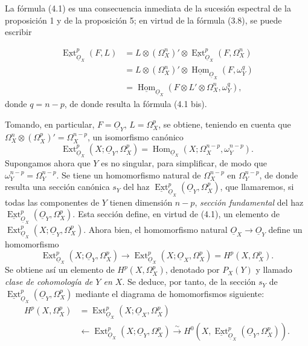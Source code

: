 \documentclass[11pt,twoside,openany]{book}
\numberwithin{equation}{section}
\newcommand{\src}[1]{%
  \phantomsection\hypertarget{src:#1}{}%
  \marginpar{\raggedleft\footnotesize\sffamily #1}%
}
\newcommand{\Osh}{\underline{O}}
\newcommand{\Homsh}{\underline{\operatorname{Hom}}}
\newcommand{\Extsh}{\underline{\operatorname{Ext}}}
\theoremstyle{plain}
\theoremstyle{definition}
\theoremstyle{remark}
\newcommand{\FgaUnitKey}{frontmatter}
\renewcommand{\src}[1]{%
  \phantomsection\hypertarget{src:\FgaUnitKey:#1}{}%
  \marginpar{\raggedleft\footnotesize\sffamily #1}%
}
\theoremstyle{plain}
\theoremstyle{definition}
\theoremstyle{remark}
\begin{document}
La fórmula (4.1) es una consecuencia inmediata de la sucesión espectral de la
proposición 1 y de la proposición 5; en virtud de la fórmula (3.8), se puede
escribir

\src{178}
\begin{align*}
\Extsh_{\Osh_X}^{p}(F,L)
&=L\otimes(\Omega_X^{n})'\otimes
  \Extsh_{\Osh_X}^{p}(F,\Omega_X^{n})\\
&=L\otimes(\Omega_X^{n})'\otimes
  \Homsh_{\Osh_X}(F,\omega_Y^{q})\\
&=\Homsh_{\Osh_X}\!\left(
  F\otimes L'\otimes\Omega_X^{n},\omega_Y^{q}\right),
\end{align*}
donde $q=n-p$, de donde resulta la fórmula (4.1 bis).

Tomando, en particular, $F=\Osh_Y$, $L=\Omega_X^{p}$, se obtiene, teniendo en cuenta
que $\Omega_X^{n}\otimes(\Omega_X^{p})'=\Omega_X^{n-p}$, un isomorfismo
canónico
\begin{equation}\tag{4.2}
  \operatorname{Ext}_{\Osh_X}^{p}(X;\Osh_Y,\Omega_X^{p})
  =\operatorname{Hom}_{\Osh_X}
  (X;\Omega_X^{n-p},\omega_Y^{n-p}).
\end{equation}
Supongamos ahora que $Y$ es no singular, para simplificar, de modo que
$\omega_Y^{n-p}=\Omega_Y^{n-p}$. Se tiene un homomorfismo natural de
$\Omega_X^{n-p}$ en $\Omega_Y^{n-p}$, de donde resulta una sección canónica $s_Y$ del
haz $\Extsh_{\Osh_X}^{p}(\Osh_Y,\Omega_X^{p})$, que llamaremos, si
todas las componentes de $Y$ tienen dimensión $n-p$, \emph{sección
fundamental} del haz $\Extsh_{\Osh_X}^{p}(\Osh_Y,\Omega_X^{p})$. Esta
sección define, en virtud de (4.1), un elemento de
$\operatorname{Ext}_{\Osh_X}^{p}(X;\Osh_Y,\Omega_X^{p})$. Ahora bien, el homomorfismo
natural $\Osh_X\longrightarrow\Osh_Y$ define un homomorfismo
\[
  \operatorname{Ext}_{\Osh_X}^{p}(X;\Osh_Y,\Omega_X^{p})
  \longrightarrow
  \operatorname{Ext}_{\Osh_X}^{p}(X;\Osh_X,\Omega_X^{p})
  =H^{p}(X,\Omega_X^{p}).
\]
Se obtiene así un elemento de $H^{p}(X,\Omega_X^{p})$, denotado por $P_X(Y)$ y llamado
\emph{clase de cohomología de $Y$ en $X$}. Se deduce, por tanto, de la sección
$s_Y$ de $\Extsh_{\Osh_X}^{p}(\Osh_Y,\Omega_X^{p})$ mediante el diagrama
de homomorfismos siguiente:
\begin{equation}\tag{4.3}
\begin{aligned}
H^{p}(X,\Omega_X^{p})
&=\operatorname{Ext}_{\Osh_X}^{p}(X;\Osh_X,\Omega_X^{p})\\
&\longleftarrow\operatorname{Ext}_{\Osh_X}^{p}(X;\Osh_Y,\Omega_X^{p})
\xrightarrow{\ \sim\ }
H^{0}\!\left(X,\Extsh_{\Osh_X}^{p}(\Osh_Y,\Omega_X^{p})\right).
\end{aligned}
\end{equation}
\end{document}
